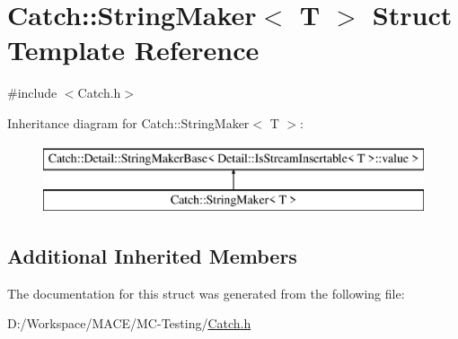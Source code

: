 \hypertarget{struct_catch_1_1_string_maker}{}\section{Catch\+:\+:String\+Maker$<$ T $>$ Struct Template Reference}
\label{struct_catch_1_1_string_maker}


{\ttfamily \#include $<$Catch.\+h$>$}

Inheritance diagram for Catch\+:\+:String\+Maker$<$ T $>$\+:\begin{figure}[H]
\begin{center}
\leavevmode
\includegraphics[height=2.000000cm]{struct_catch_1_1_string_maker}
\end{center}
\end{figure}
\subsection*{Additional Inherited Members}


The documentation for this struct was generated from the following file\+:\begin{DoxyCompactItemize}
\item 
D\+:/\+Workspace/\+M\+A\+C\+E/\+M\+C-\/\+Testing/\hyperlink{_catch_8h}{Catch.\+h}\end{DoxyCompactItemize}
